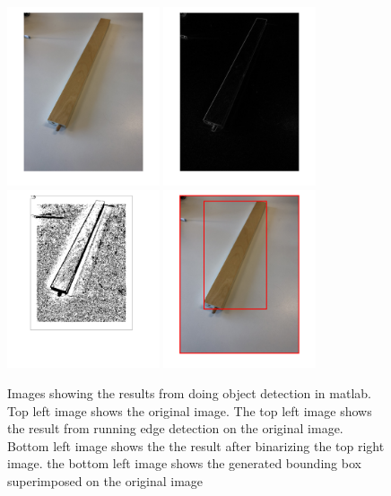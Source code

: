 \begin{figure}[hbtp]
\begin{center}
\includegraphics[width = 0.4\textwidth]{./Images/matlabImage1.png}
\includegraphics[width = 0.4\textwidth]{./Images/matlabImage2.png}
\includegraphics[width = 0.4\textwidth]{./Images/matlabImage3.png} 
\includegraphics[width = 0.4\textwidth]{./Images/matlabImage4.png} 
\caption{Images showing the results from doing object detection in matlab. Top left image shows the original image. The top left image shows the result from running edge detection on the original image. Bottom left image shows the the result after  binarizing the top right image. the bottom left image shows the generated bounding box superimposed on the original image}
\label{fig:matlabImages}
\end{center}
\end{figure}

